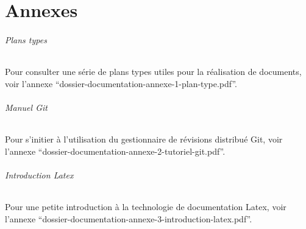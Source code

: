 \documentclass[a4paper]{article}
\begin{document}
\part{Annexes}

\paragraph{Plans types} Pour consulter une série de plans types utiles pour la réalisation de documents, voir l'annexe ``dossier-documentation-annexe-1-plan-type.pdf''.
\paragraph{Manuel Git} Pour s'initier à l'utilisation du gestionnaire de révisions distribué Git, voir l'annexe ``dossier-documentation-annexe-2-tutoriel-git.pdf''.
\paragraph{Introduction Latex} Pour une petite introduction à la technologie de documentation Latex, voir l'annexe ``dossier-documentation-annexe-3-introduction-latex.pdf''.
\end{document}
